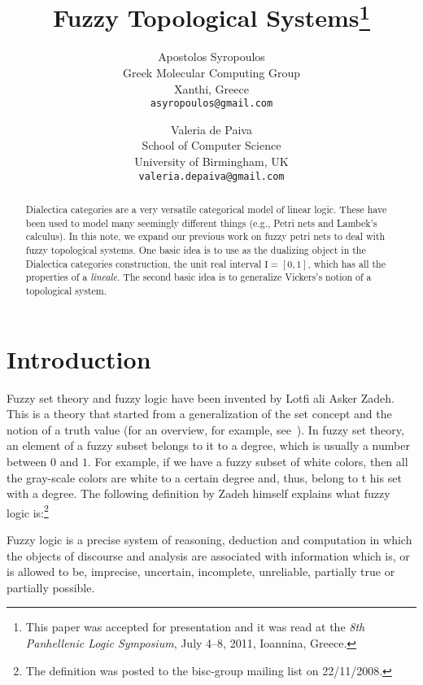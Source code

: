 \documentclass[11pt]{article}
\newenvironment{definition}[1][Definition]{\begin{trivlist}
\item[\hskip \labelsep {\bfseries #1}]}{\end{trivlist}}
\begin{document}
\title{Fuzzy Topological Systems\thanks{This paper was accepted for presentation and it was 
    read at the {\em 8th Panhellenic Logic Symposium}, July 4--8, 2011, Ioannina, Greece.}}
\author{Apostolos Syropoulos\\ 
        Greek Molecular Computing Group\\
        Xanthi, Greece\\
        \texttt{asyropoulos@gmail.com}\\
\and 
       Valeria de Paiva\\
       School of Computer Science\\
       University of Birmingham, UK\\
       \texttt{valeria.depaiva@gmail.com}\\
}
\date{}
\maketitle
\begin{abstract}
Dialectica categories are a very versatile categorical model of linear logic. 
These have been used to model many seemingly different things (e.g.,
Petri nets and Lambek's calculus). In this note, we expand our previous
work on fuzzy petri nets to deal with fuzzy topological systems. One basic idea is 
to use as the dualizing object in the Dialectica categories construction, 
the unit real interval $\mathrm{I}=[0,1]$,  which has all the properties of a 
{\em lineale}. The second basic idea is to generalize Vickers's notion of a 
topological system.
\end{abstract}
\section{Introduction}
Fuzzy set theory and fuzzy logic have been invented by Lotfi ali Asker Zadeh. 
This is a theory that started from a generalization of the set concept and the 
notion of a truth value (for an overview, for example, see~\cite{klir95}). In fuzzy 
set theory, an element of a fuzzy subset belongs to it to a degree, which is usually 
a number between $0$ and $1$. For example, if we have a fuzzy subset of white colors, 
then all the gray-scale colors are white to a certain degree and, thus, belong to t
his set with a degree. The following definition by Zadeh himself explains what  fuzzy logic 
is:\footnote{The definition was posted to the bisc-group mailing list on 22/11/2008.}        
\begin{definition}
Fuzzy logic is a precise system of reasoning, deduction and computation in which 
the objects of discourse and analysis are associated with information which is, or 
is allowed to be, imprecise, uncertain, incomplete, unreliable, partially true or 
partially possible. 
\end{definition}
\end{document}
